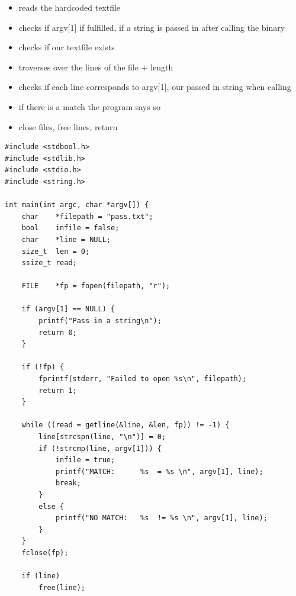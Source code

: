 \documentclass[12pt, letterpaper]{article}
\begin{document}
\begin{sloppypar}
\begin{flushleft}
\begin{itemize}
\item reads the hardcoded textfile
\item checks if argv[1] if fulfilled, if a string is passed in after calling the binary
\item checks if our textfile exists 
\item traverses over the lines of the file + length
\item checks if each line corresponds to argv[1], our passed in string when calling
\item if there is a match the program says so
\item close files, free lines, return
\end{itemize} 
\begin{lstlisting}
#include <stdbool.h>
#include <stdlib.h>
#include <stdio.h>
#include <string.h>

int main(int argc, char *argv[]) {
    char    *filepath = "pass.txt";
    bool    infile = false;
    char    *line = NULL;
    size_t  len = 0;
    ssize_t read;

    FILE    *fp = fopen(filepath, "r");

    if (argv[1] == NULL) {
        printf("Pass in a string\n");
        return 0;
    }   

    if (!fp) {
        fprintf(stderr, "Failed to open %s\n", filepath);
        return 1;
    }   

    while ((read = getline(&line, &len, fp)) != -1) {
        line[strcspn(line, "\n")] = 0;
        if (!strcmp(line, argv[1])) {
            infile = true;
            printf("MATCH:      %s  = %s \n", argv[1], line);
            break;
        }   
        else {
            printf("NO MATCH:   %s  != %s \n", argv[1], line);
        }   
    }   
    fclose(fp);

    if (line)
        free(line);


\end{lstlisting}
\end{flushleft}
\end{sloppypar}
\end{document}
